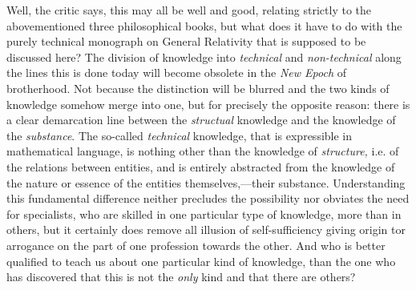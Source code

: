 \documentclass[12pt]{book}
\begin{document}
Well, the critic says, this may all be well and good, relating strictly to the abovementioned three philosophical books,
but what does it have to do with the purely technical monograph on General Relativity that is supposed to be discussed here?
The division of knowledge into \emph{technical} and \emph{non\hyp{}technical} along the lines this is done today will become obsolete
in the \emph{New Epoch} of brotherhood.
Not because the distinction will be blurred and the two kinds of knowledge somehow merge into one, but for precisely the opposite reason:
there is a clear demarcation line between the \emph{structual} knowledge and the knowledge of the \emph{substance}.
The so-called \emph{technical} knowledge, that is expressible in mathematical language, is nothing other than the knowledge
of \emph{structure,} i.e. of the relations between entities, and is entirely abstracted from the knowledge of the nature or essence of
the entities themselves,---their substance.
Understanding this fundamental difference neither precludes the possibility nor obviates the need for specialists, who
are skilled in one particular type of knowledge, more than in others, but it certainly does remove all illusion of
self\hyp{}sufficiency giving origin tor arrogance on the part of one profession towards the other.
And who is better qualified to teach us about one particular kind of knowledge, than the one who has discovered that this
is not the \emph{only} kind and that there are others?
\end{document}
